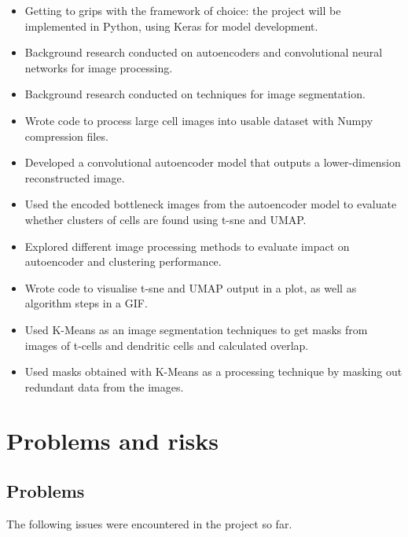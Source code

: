 \documentclass[11pt]{article}
\begin{document}
\begin{itemize}
    \tightlist
\item Getting to grips with the framework of choice: the project will be implemented in Python, using Keras for model development.
\item Background research conducted on autoencoders and convolutional neural networks for image processing.
\item Background research conducted on techniques for image segmentation.
\item Wrote code to process large cell images into usable dataset with Numpy compression files.
\item Developed a convolutional autoencoder model that outputs a lower-dimension reconstructed image.
\item Used the encoded bottleneck images from the autoencoder model to evaluate whether clusters of cells are found using t-sne and UMAP.
\item Explored different image processing methods to evaluate impact on autoencoder and clustering performance.
\item Wrote code to visualise t-sne and UMAP output in a plot, as well as algorithm steps in a GIF.
\item Used K-Means as an image segmentation techniques to get masks from images of t-cells and dendritic cells and calculated overlap.
\item Used masks obtained with K-Means as a processing technique by masking out redundant data from the images.
\end{itemize}

\section{Problems and risks}\label{problems-and-risks}

\subsection{Problems}\label{problems}

The following issues were encountered in the project so far.
\end{document}
